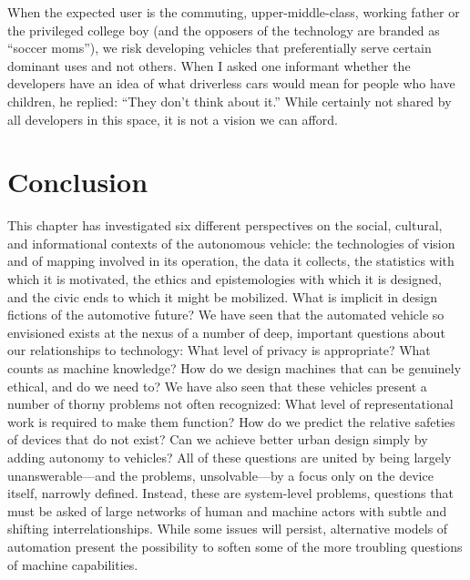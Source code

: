 
When the
expected user is the commuting, upper-middle-class, working father or
the privileged college boy (and the opposers of the technology are
branded as ``soccer moms''), we risk developing
vehicles that preferentially serve certain dominant uses and not
others. When I asked one informant whether the developers have an idea
of what driverless cars would mean for people who have children, he
replied:  ``They don't think about it.'' While certainly not shared by
all developers in this space, it is not a vision we can afford.

\section{Conclusion}



This chapter has investigated six different perspectives on the
social, cultural, and informational contexts of the autonomous
vehicle:  the technologies of vision and of mapping involved
in its operation, the 
data it collects, the statistics with which it is motivated, the
ethics and epistemologies with which it is designed, and the civic
ends to which it might be mobilized. What is implicit in design
fictions of the automotive future? We
have seen that the automated vehicle so envisioned exists at the
nexus of a number of deep, important questions about our relationships
to technology: What level of privacy is appropriate? What counts as machine
knowledge? How do we design machines that can be genuinely ethical,
and do we need to? We have also seen that these vehicles present a
number of thorny problems not often recognized: What level of
representational work is required to make them function? How do we
predict the relative safeties of devices that do not exist? Can we
achieve better urban design simply by adding autonomy to vehicles?
All of these questions are united by being largely unanswerable---and
the problems, unsolvable---by a focus only on the device itself,
narrowly defined. Instead, these are system-level problems, questions
that must be asked of large networks of human and machine actors with
subtle and shifting interrelationships. While some issues will
persist, alternative models of 
automation present the possibility to soften some of the more
troubling questions of machine capabilities. 

